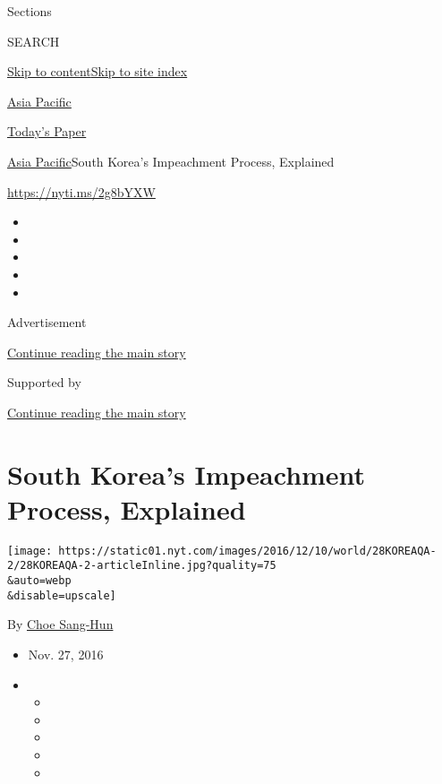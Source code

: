Sections

SEARCH

\protect\hyperlink{site-content}{Skip to
content}\protect\hyperlink{site-index}{Skip to site index}

\href{https://www.nytimes.com/section/world/asia}{Asia Pacific}

\href{https://myaccount.nytimes.com/auth/login?response_type=cookie\&client_id=vi}{}

\href{https://www.nytimes.com/section/todayspaper}{Today's Paper}

\href{/section/world/asia}{Asia Pacific}\textbar{}South Korea's
Impeachment Process, Explained

\url{https://nyti.ms/2g8bYXW}

\begin{itemize}
\item
\item
\item
\item
\item
\end{itemize}

Advertisement

\protect\hyperlink{after-top}{Continue reading the main story}

Supported by

\protect\hyperlink{after-sponsor}{Continue reading the main story}

\hypertarget{south-koreas-impeachment-process-explained}{%
\section{South Korea's Impeachment Process,
Explained}\label{south-koreas-impeachment-process-explained}}

\texttt{[image: https://static01.nyt.com/images/2016/12/10/world/28KOREAQA-2/28KOREAQA-2-articleInline.jpg?quality=75\\\&auto=webp\\\&disable=upscale]}

By \href{http://www.nytimes.com/by/choe-sang-hun}{Choe Sang-Hun}

\begin{itemize}
\item
  Nov. 27, 2016
\item
  \begin{itemize}
  \item
  \item
  \item
  \item
  \item
  \end{itemize}
\end{itemize}

